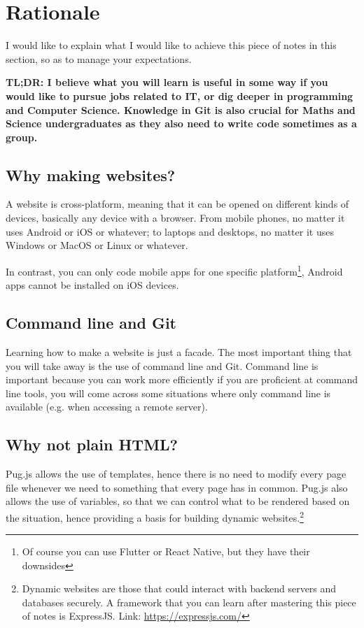 \section{Rationale}

I would like to explain what I would like to achieve this piece of notes in this section, so as to manage your expectations.
\vspace{6mm}

\textbf{TL;DR: I believe what you will learn is useful in some way if you would like to pursue jobs related to IT, or dig deeper in programming and Computer Science. Knowledge in Git is also crucial for Maths and Science undergraduates as they also need to write code sometimes as a group.}

\subsection*{Why making websites?}

A website is cross-platform, meaning that it can be opened on different kinds of devices, basically any device with a browser. From mobile phones, no matter it uses Android or iOS or whatever; to laptops and desktops, no matter it uses Windows or MacOS or Linux or whatever.

In contrast, you can only code mobile apps for one specific platform\footnote{Of course you can use Flutter or React Native, but they have their downsides}, Android apps cannot be installed on iOS devices. 

\subsection*{Command line and Git}

Learning how to make a website is just a facade. The most important thing that you will take away is the use of command line and Git. Command line is important because you can work more efficiently if you are proficient at command line tools, you will come across some situations where only command line is available (e.g. when accessing a remote server). 

\subsection*{Why not plain HTML?}

Pug.js allows the use of templates, hence there is no need to modify every page file whenever we need to something that every page has in common. Pug.js also allows the use of variables, so that we can control what to be rendered based on the situation, hence providing a basis for building dynamic websites.\footnote{Dynamic websites are those that could interact with backend servers and databases securely. A framework that you can learn after mastering this piece of notes is ExpressJS. Link: \href{https://expressjs.com/}{https://expressjs.com/}}

